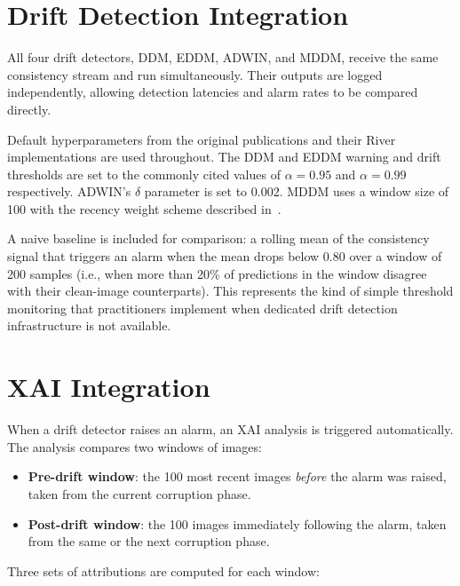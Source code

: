 \section{Drift Detection Integration}
\label{sec:dd-integration}

All four drift detectors, DDM, EDDM, ADWIN, and MDDM, receive the same consistency stream and run simultaneously. Their outputs are logged independently, allowing detection latencies and alarm rates to be compared directly.

Default hyperparameters from the original publications and their River~\autocite{Montiel2021} implementations are used throughout. The DDM and EDDM warning and drift thresholds are set to the commonly cited values of $\alpha = 0.95$ and $\alpha = 0.99$ respectively. ADWIN's $\delta$ parameter is set to $0.002$. MDDM uses a window size of 100 with the recency weight scheme described in~\textcite{Pesaranghader2017}.

A naive baseline is included for comparison: a rolling mean of the consistency signal that triggers an alarm when the mean drops below 0.80 over a window of 200 samples (i.e., when more than 20\% of predictions in the window disagree with their clean-image counterparts). This represents the kind of simple threshold monitoring that practitioners implement when dedicated drift detection infrastructure is not available.

\section{XAI Integration}
\label{sec:xai-integration}

When a drift detector raises an alarm, an XAI analysis is triggered automatically. The analysis compares two windows of images:

\begin{itemize}
  \item \textbf{Pre-drift window}: the 100 most recent images \textit{before} the alarm was raised, taken from the current corruption phase.
  \item \textbf{Post-drift window}: the 100 images immediately following the alarm, taken from the same or the next corruption phase.
\end{itemize}

Three sets of attributions are computed for each window:

